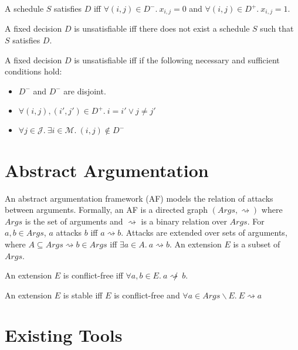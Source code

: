 \begin{definition}
	A schedule $S$ satisfies $D$ iff $\forall(i,j)\in D^-.\ x_{i,j}=0$ and $\forall (i,j)\in D^+.\ x_{i,j}=1$.
\end{definition}

\begin{definition}
	A fixed decision $D$ is unsatisfiable iff there does not exist a schedule $S$ such that $S$ satisfies $D$. 
\end{definition}

\begin{theorem}
	A fixed decision $D$ is unsatisfiable iff if the following necessary and sufficient conditions hold:
	\begin{itemize}
		\item$D^-$ and $D^-$ are disjoint.
		\item$\forall(i,j),(i',j')\in D^+.\ i=i'\lor j\neq j'$
		\item$\forall j\in\mathcal{J}.\ \exists i\in\mathcal{M}.\ (i,j)\not\in D^-$
	\end{itemize}
\end{theorem}

\section{Abstract Argumentation}

An abstract argumentation framework (AF) models the relation of attacks between arguments. Formally, an AF is a directed graph $(Args,\rightsquigarrow)$ where $Args$ is the set of arguments and $\rightsquigarrow$ is a binary relation over $Args$. For $a,b\in Args$, $a$ attacks $b$ iff $a\rightsquigarrow b$. Attacks are extended over sets of arguments, where $A\subseteq Args\rightsquigarrow b\in Args$ iff $\exists a\in A.\ a\rightsquigarrow b$. An extension $E$ is a subset of $Args$.

\begin{definition}
	An extension $E$ is conflict-free iff $\forall a,b\in E.\ a\not\rightsquigarrow\ b$.
\end{definition}

\begin{definition}
	An extension $E$ is stable iff $E$ is conflict-free and $\forall a\in Args\backslash E.\ E\rightsquigarrow a$
\end{definition}

\section{Existing Tools}

